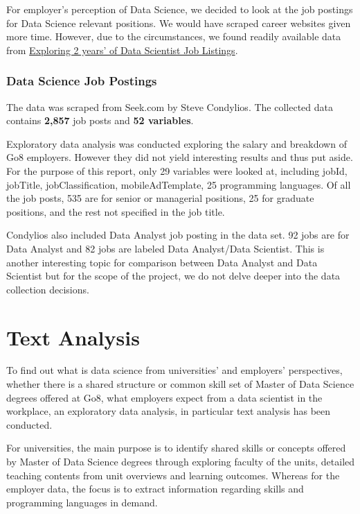 \documentclass[
  letterpaper,
]{report}
\begin{document}
For employer's perception of Data Science, we decided to look at the job
postings for Data Science relevant positions. We would have scraped
career websites given more time. However, due to the circumstances, we
found readily available data from
\href{https://www.kaggle.com/code/nomilk/exploring-2-years-of-data-scientist-job-listings/data}{Exploring
2 years' of Data Scientist Job Listings}.

\hypertarget{data-science-job-postings}{%
\section{Data Science Job Postings}\label{data-science-job-postings}}

The data was scraped from Seek.com by Steve Condylios. The collected
data contains \textbf{2,857} job posts and \textbf{52 variables}.

Exploratory data analysis was conducted exploring the salary and
breakdown of Go8 employers. However they did not yield interesting
results and thus put aside. For the purpose of this report, only 29
variables were looked at, including jobId, jobTitle, jobClassification,
mobileAdTemplate, 25 programming languages. Of all the job posts, 535
are for senior or managerial positions, 25 for graduate positions, and
the rest not specified in the job title.

Condylios also included Data Analyst job posting in the data set. 92
jobs are for Data Analyst and 82 jobs are labeled Data Analyst/Data
Scientist. This is another interesting topic for comparison between Data
Analyst and Data Scientist but for the scope of the project, we do not
delve deeper into the data collection decisions.

\part{Text Analysis}

To find out what is data science from universities' and employers'
perspectives, whether there is a shared structure or common skill set of
Master of Data Science degrees offered at Go8, what employers expect
from a data scientist in the workplace, an exploratory data analysis, in
particular text analysis has been conducted.

For universities, the main purpose is to identify shared skills or
concepts offered by Master of Data Science degrees through exploring
faculty of the units, detailed teaching contents from unit overviews and
learning outcomes. Whereas for the employer data, the focus is to
extract information regarding skills and programming languages in
demand.
\end{document}
